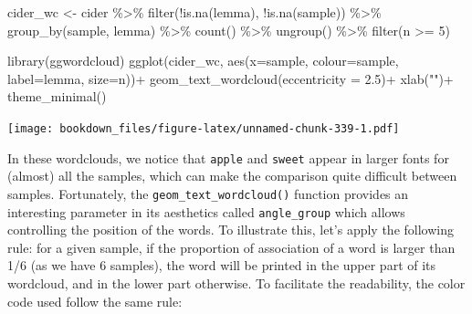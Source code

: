 \documentclass[
]{krantz}
\makeatletter
\newenvironment{Shaded}{\begin{snugshade}}{\end{snugshade}}
\newcommand{\AttributeTok}[1]{\textcolor[rgb]{0.61,0.61,0.61}{#1}}
\newcommand{\DecValTok}[1]{\textcolor[rgb]{0.06,0.06,0.06}{#1}}
\newcommand{\FloatTok}[1]{\textcolor[rgb]{0.06,0.06,0.06}{#1}}
\newcommand{\FunctionTok}[1]{\textcolor[rgb]{0,0,0}{#1}}
\newcommand{\NormalTok}[1]{#1}
\newcommand{\OtherTok}[1]{\textcolor[rgb]{0.37,0.37,0.37}{#1}}
\newcommand{\SpecialCharTok}[1]{\textcolor[rgb]{0,0,0}{#1}}
\newcommand{\StringTok}[1]{\textcolor[rgb]{0.5,0.5,0.5}{#1}}
\newenvironment{kframe}{%
\medskip{}
\setlength{\fboxsep}{.8em}
 \def\at@end@of@kframe{}%
 \ifinner\ifhmode%
  \def\at@end@of@kframe{\end{minipage}}%
  \begin{minipage}{\columnwidth}%
 \fi\fi%
 \def\FrameCommand##1{\hskip\@totalleftmargin \hskip-\fboxsep
 \colorbox{shadecolor}{##1}\hskip-\fboxsep
     \hskip-\linewidth \hskip-\@totalleftmargin \hskip\columnwidth}%
 \MakeFramed {\advance\hsize-\width
   \@totalleftmargin\z@ \linewidth\hsize
   \@setminipage}}%
 {\par\unskip\endMakeFramed%
 \at@end@of@kframe}
\renewenvironment{Shaded}{\begin{kframe}}{\end{kframe}}
\makeatother
\begin{document}
\begin{Shaded}
\begin{Highlighting}[]
\NormalTok{cider\_wc }\OtherTok{\textless{}{-}}\NormalTok{ cider }\SpecialCharTok{\%\textgreater{}\%} 
  \FunctionTok{filter}\NormalTok{(}\SpecialCharTok{!}\FunctionTok{is.na}\NormalTok{(lemma), }\SpecialCharTok{!}\FunctionTok{is.na}\NormalTok{(sample)) }\SpecialCharTok{\%\textgreater{}\%} 
  \FunctionTok{group\_by}\NormalTok{(sample, lemma) }\SpecialCharTok{\%\textgreater{}\%} 
  \FunctionTok{count}\NormalTok{() }\SpecialCharTok{\%\textgreater{}\%} 
  \FunctionTok{ungroup}\NormalTok{() }\SpecialCharTok{\%\textgreater{}\%} 
  \FunctionTok{filter}\NormalTok{(n }\SpecialCharTok{\textgreater{}=} \DecValTok{5}\NormalTok{)}

\FunctionTok{library}\NormalTok{(ggwordcloud)}
\FunctionTok{ggplot}\NormalTok{(cider\_wc, }\FunctionTok{aes}\NormalTok{(}\AttributeTok{x=}\NormalTok{sample, }\AttributeTok{colour=}\NormalTok{sample, }\AttributeTok{label=}\NormalTok{lemma, }\AttributeTok{size=}\NormalTok{n))}\SpecialCharTok{+}
  \FunctionTok{geom\_text\_wordcloud}\NormalTok{(}\AttributeTok{eccentricity =} \FloatTok{2.5}\NormalTok{)}\SpecialCharTok{+}
  \FunctionTok{xlab}\NormalTok{(}\StringTok{""}\NormalTok{)}\SpecialCharTok{+}
  \FunctionTok{theme\_minimal}\NormalTok{()}
\end{Highlighting}
\end{Shaded}

\texttt{[image: bookdown\_files/figure-latex/unnamed-chunk-339-1.pdf]}

In these wordclouds, we notice that \texttt{apple} and \texttt{sweet} appear in larger fonts for (almost) all the samples, which can make the comparison quite difficult between samples. Fortunately, the \texttt{geom\_text\_wordcloud()} function provides an interesting parameter in its aesthetics called \texttt{angle\_group} which allows controlling the position of the words. To illustrate this, let's apply the following rule: for a given sample, if the proportion of association of a word is larger than 1/6 (as we have 6 samples), the word will be printed in the upper part of its wordcloud, and in the lower part otherwise. To facilitate the readability, the color code used follow the same rule:
\end{document}
